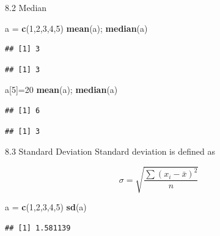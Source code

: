 \documentclass[
  ignorenonframetext,
]{beamer}
\newenvironment{Shaded}{\begin{snugshade}}{\end{snugshade}}
\newcommand{\DecValTok}[1]{\textcolor[rgb]{0.00,0.00,0.81}{#1}}
\newcommand{\FunctionTok}[1]{\textcolor[rgb]{0.13,0.29,0.53}{\textbf{#1}}}
\newcommand{\NormalTok}[1]{#1}
\newcommand{\OtherTok}[1]{\textcolor[rgb]{0.56,0.35,0.01}{#1}}
\begin{document}
\begin{frame}[fragile]{8.2 Median}
\protect\hypertarget{median}{}
\begin{Shaded}
\begin{Highlighting}[]
\NormalTok{a }\OtherTok{=} \FunctionTok{c}\NormalTok{(}\DecValTok{1}\NormalTok{,}\DecValTok{2}\NormalTok{,}\DecValTok{3}\NormalTok{,}\DecValTok{4}\NormalTok{,}\DecValTok{5}\NormalTok{)}
\FunctionTok{mean}\NormalTok{(a); }\FunctionTok{median}\NormalTok{(a)}
\end{Highlighting}
\end{Shaded}

\begin{verbatim}
## [1] 3
\end{verbatim}

\begin{verbatim}
## [1] 3
\end{verbatim}

\begin{Shaded}
\begin{Highlighting}[]
\NormalTok{a[}\DecValTok{5}\NormalTok{]}\OtherTok{=}\DecValTok{20}
\FunctionTok{mean}\NormalTok{(a); }\FunctionTok{median}\NormalTok{(a)}
\end{Highlighting}
\end{Shaded}

\begin{verbatim}
## [1] 6
\end{verbatim}

\begin{verbatim}
## [1] 3
\end{verbatim}
\end{frame}

\begin{frame}[fragile]{8.3 Standard Deviation}
\protect\hypertarget{standard-deviation}{}
Standard deviation is defined as

\[ \sigma = \sqrt{\frac{ \sum (x_{i} - \bar{x})^2}{n}} \]

\begin{Shaded}
\begin{Highlighting}[]
\NormalTok{a }\OtherTok{=} \FunctionTok{c}\NormalTok{(}\DecValTok{1}\NormalTok{,}\DecValTok{2}\NormalTok{,}\DecValTok{3}\NormalTok{,}\DecValTok{4}\NormalTok{,}\DecValTok{5}\NormalTok{)}
\FunctionTok{sd}\NormalTok{(a)}
\end{Highlighting}
\end{Shaded}

\begin{verbatim}
## [1] 1.581139
\end{verbatim}
\end{frame}
\end{document}
